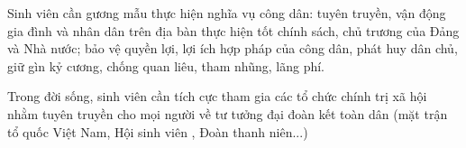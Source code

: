 Sinh viên cần gương mẫu thực hiện nghĩa vụ công dân: tuyên truyền, vận động gia đình và nhân dân trên địa bàn thực hiện tốt chính sách, chủ trương của Đảng và Nhà nước; bảo vệ quyền lợi, lợi ích hợp pháp của công dân, phát huy dân chủ, giữ gìn kỷ cương, chống quan liêu, tham nhũng, lãng phí.

Trong đời sống, sinh viên cần tích cực tham gia các tổ chức chính trị xã hội nhằm tuyên truyền cho mọi người về tư tưởng đại đoàn kết toàn dân (mặt trận tổ quốc Việt Nam, Hội sinh viên , Đoàn thanh niên...)

\cleardoublepage